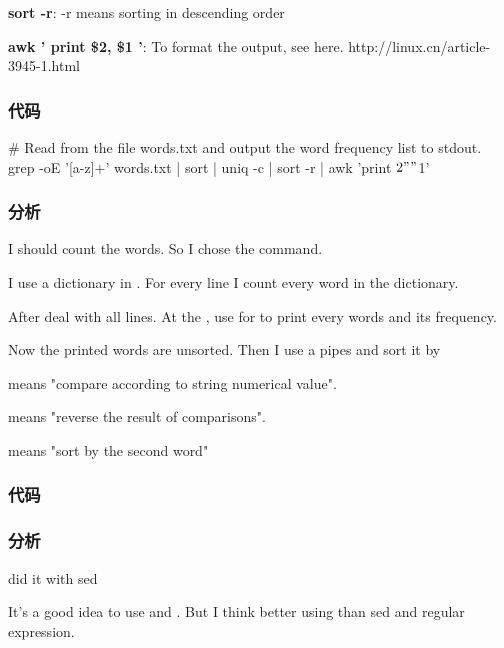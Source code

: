 \textbf{sort -r}: -r means sorting in descending order

\textbf{awk '{ print \$2, \$1 }'}: To format the output, see here. http://linux.cn/article-3945-1.html

\subsubsection{代码}
\begin{Code}
# Read from the file words.txt and output the word frequency list to stdout.
grep -oE '[a-z]+' words.txt | sort | uniq -c | sort -r | awk '{print $2" "$1}' 
\end{Code}

\subsubsection{分析}
I should count the words. So I chose the  command.
\begindot
\item I use a dictionary in . For every line I count every word in the dictionary.
\item After deal with all lines. At the , use for  to print every words and its frequency.
\myenddot

Now the printed words are unsorted. Then I use a \fn{|} pipes and sort it by 
\begindot
\item {} means "compare according to string numerical value".
\item {} means "reverse the result of comparisons".
\item {} means "sort by the second word"
\myenddot

\subsubsection{代码}

\subsubsection{分析}
did it with sed

It's a good idea to use  and . But I think better using  than {sed} and regular expression.

